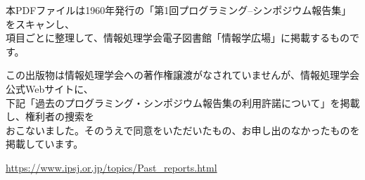 \documentclass[b5j]{jsarticle}
\begin{document}
\begin{flushleft}

本PDFファイルは1960年発行の「第1回プログラミング–シンポジウム報告集」をスキャンし、\\項目ごとに整理して、情報処理学会電子図書館「情報学広場」に掲載するものです。

\medskip

この出版物は情報処理学会への著作権譲渡がなされていませんが、情報処理学会公式Webサイトに、\\下記「過去のプログラミング・シンポジウム報告集の利用許諾について」を掲載し、権利者の捜索を\\おこないました。そのうえで同意をいただいたもの、お申し出のなかったものを掲載しています。

\medskip

\url{https://www.ipsj.or.jp/topics/Past_reports.html}

\end{flushleft}

\bigskip
\end{document}
